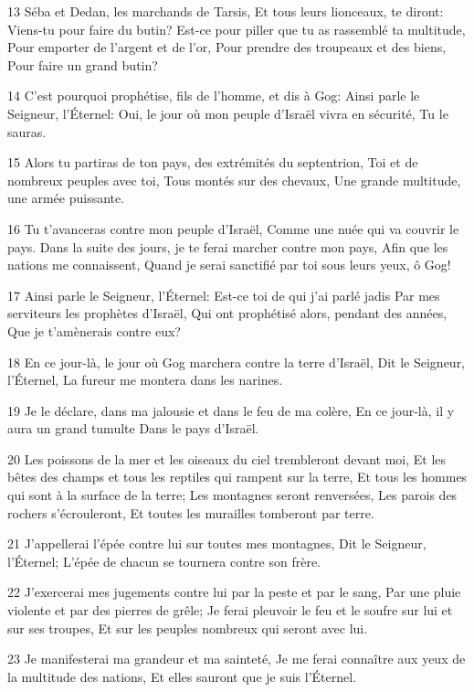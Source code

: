 \par 13 Séba et Dedan, les marchands de Tarsis, Et tous leurs lionceaux, te diront: Viens-tu pour faire du butin? Est-ce pour piller que tu as rassemblé ta multitude, Pour emporter de l'argent et de l'or, Pour prendre des troupeaux et des biens, Pour faire un grand butin?
\par 14 C'est pourquoi prophétise, fils de l'homme, et dis à Gog: Ainsi parle le Seigneur, l'Éternel: Oui, le jour où mon peuple d'Israël vivra en sécurité, Tu le sauras.
\par 15 Alors tu partiras de ton pays, des extrémités du septentrion, Toi et de nombreux peuples avec toi, Tous montés sur des chevaux, Une grande multitude, une armée puissante.
\par 16 Tu t'avanceras contre mon peuple d'Israël, Comme une nuée qui va couvrir le pays. Dans la suite des jours, je te ferai marcher contre mon pays, Afin que les nations me connaissent, Quand je serai sanctifié par toi sous leurs yeux, ô Gog!
\par 17 Ainsi parle le Seigneur, l'Éternel: Est-ce toi de qui j'ai parlé jadis Par mes serviteurs les prophètes d'Israël, Qui ont prophétisé alors, pendant des années, Que je t'amènerais contre eux?
\par 18 En ce jour-là, le jour où Gog marchera contre la terre d'Israël, Dit le Seigneur, l'Éternel, La fureur me montera dans les narines.
\par 19 Je le déclare, dans ma jalousie et dans le feu de ma colère, En ce jour-là, il y aura un grand tumulte Dans le pays d'Israël.
\par 20 Les poissons de la mer et les oiseaux du ciel trembleront devant moi, Et les bêtes des champs et tous les reptiles qui rampent sur la terre, Et tous les hommes qui sont à la surface de la terre; Les montagnes seront renversées, Les parois des rochers s'écrouleront, Et toutes les murailles tomberont par terre.
\par 21 J'appellerai l'épée contre lui sur toutes mes montagnes, Dit le Seigneur, l'Éternel; L'épée de chacun se tournera contre son frère.
\par 22 J'exercerai mes jugements contre lui par la peste et par le sang, Par une pluie violente et par des pierres de grêle; Je ferai pleuvoir le feu et le soufre sur lui et sur ses troupes, Et sur les peuples nombreux qui seront avec lui.
\par 23 Je manifesterai ma grandeur et ma sainteté, Je me ferai connaître aux yeux de la multitude des nations, Et elles sauront que je suis l'Éternel.

